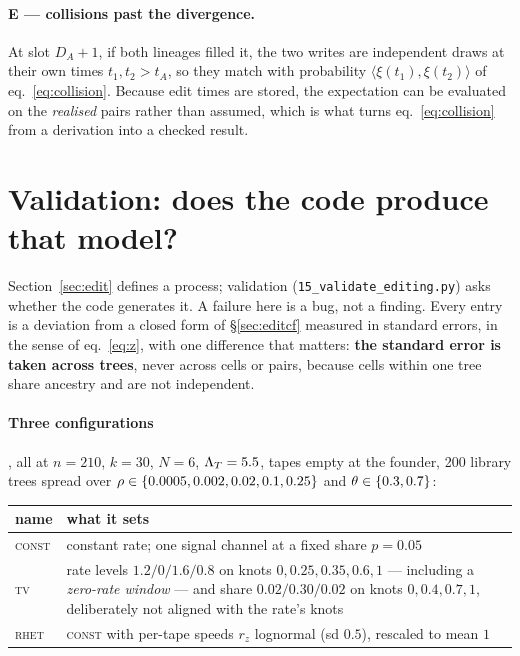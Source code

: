 \paragraph{E --- collisions past the divergence.} At slot $D_A+1$, if both lineages filled it, the two
writes are independent draws at their own times $t_1,t_2>t_A$, so they match with probability
$\langle\xi(t_1),\xi(t_2)\rangle$ of eq.~\eqref{eq:collision}. Because edit times are stored, the
expectation can be evaluated on the \emph{realised} pairs rather than assumed, which is what turns
eq.~\eqref{eq:collision} from a derivation into a checked result.

\section{Validation: does the code produce that model?}\label{sec:editval}

Section~\ref{sec:edit} defines a process; validation (\texttt{15\_validate\_editing.py}) asks whether
the code generates it. A failure here is a bug, not a finding. Every entry is a deviation from a
closed form of \S\ref{sec:editcf} measured in standard errors, in the sense of eq.~\eqref{eq:z}, with
one difference that matters: \textbf{the standard error is taken across trees}, never across cells or
pairs, because cells within one tree share ancestry and are not independent.

\paragraph{Three configurations}, all at $n=210$, $k=30$, $N=6$, $\Lambda_T=5.5$, tapes empty at the
founder, 200 library trees spread over $\rho\in\{0.0005,0.002,0.02,0.1,0.25\}$ and
$\theta\in\{0.3,0.7\}$:
\begin{center}\small
\begin{tabular}{@{}lp{}@{}}
\toprule
name & what it sets \\
\midrule
\textsc{const} & constant rate; one signal channel at a fixed share $p=0.05$ \\
\textsc{tv}    & rate levels $1.2/0/1.6/0.8$ on knots $0,0.25,0.35,0.6,1$ --- including a
                 \emph{zero-rate window} --- and share $0.02/0.30/0.02$ on knots $0,0.4,0.7,1$,
                 deliberately not aligned with the rate's knots \\
\textsc{rhet}  & \textsc{const} with per-tape speeds $r_z$ lognormal (sd $0.5$), rescaled to mean $1$ \\
\bottomrule
\end{tabular}
\end{center}

